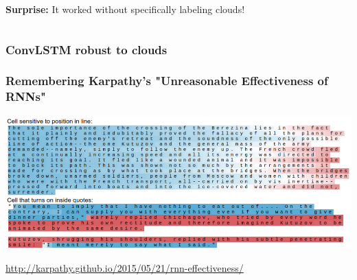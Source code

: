 \begin{frame}

\vfill
\Huge\color{black}
\begin{center}
	\begin{columns}
		\column{\textwidth}
		\vspace{7em}
		
		\textbf{\color{tumbluedark}Surprise:} 
		\hfill It worked without specifically labeling clouds!
	\end{columns}
\end{center}

\vfill

\end{frame}


\begin{frame}
\frametitle{ConvLSTM robust to clouds}


\end{frame}


\begin{frame}
	\frametitle{Remembering Karpathy's "Unreasonable Effectiveness of RNNs"}
	
	\includegraphics[width=\textwidth]{images/karpathy}
	
	\url{http://karpathy.github.io/2015/05/21/rnn-effectiveness/}
\end{frame}


